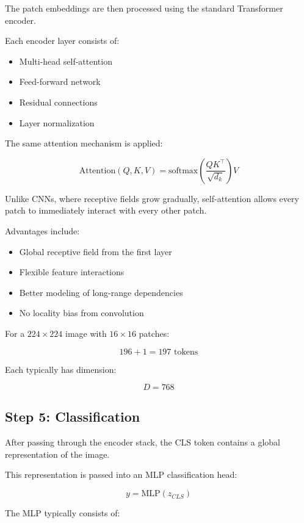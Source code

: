 \documentclass[11pt]{article}
\begin{document}
The patch embeddings are then processed using the standard Transformer encoder.

Each encoder layer consists of:

\begin{itemize}

\item Multi-head self-attention
\item Feed-forward network
\item Residual connections
\item Layer normalization

\end{itemize}

The same attention mechanism is applied:

\[
\text{Attention}(Q,K,V)
=
\text{softmax}
\left(
\frac{QK^\top}{\sqrt{d_k}}
\right)V
\]

Unlike CNNs, where receptive fields grow gradually, self-attention allows every patch to immediately interact with every other patch.

Advantages include:

\begin{itemize}

\item Global receptive field from the first layer
\item Flexible feature interactions
\item Better modeling of long-range dependencies
\item No locality bias from convolution

\end{itemize}

For a $224 \times 224$ image with $16 \times 16$ patches:

\[
196 + 1 = 197 \text{ tokens}
\]

Each typically has dimension:

\[
D = 768
\]

\subsection{Step 5: Classification}

After passing through the encoder stack, the CLS token contains a global representation of the image.

This representation is passed into an MLP classification head:

\[
y = \text{MLP}(z_{CLS})
\]

The MLP typically consists of:
\end{document}
